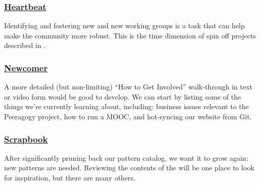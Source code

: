 \subsubsection*{\hyperref[sec:Heartbeat]{Heartbeat}} Identifying and fostering new  and new working groups is a task that can help make the community more robust.  This is the time dimension of spin off projects described in .

\subsubsection*{\hyperref[sec:Newcomer]{Newcomer}} A more detailed (but non-limiting) ``How to Get Involved'' walk-through in text or video form would be good to develop. We can start by listing some of the things we're currently learning about, including: business issues relevant to the Peeragogy project, how to run a MOOC, and hot-syncing our website from Git.

\subsubsection*{\hyperref[sec:Scrapbook]{Scrapbook}} 
After significantly pruning back our pattern catalog, we want it to grow again: new patterns are needed.  Reviewing the contents of the  will be one place to look for inspiration, but there are many others.




